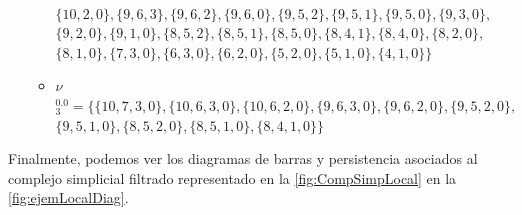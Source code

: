 \documentclass[12pt, a4paper, twoside]{book}
\numberwithin{equation}{section}
\theoremstyle{definition}
\newenvironment{ejem}
  {\pushQED{\qed}\renewcommand{\qedsymbol}{$\blacktriangleleft$}\ejemplo}
  {\popQED\endejemplo}
\theoremstyle{remark}
\theoremstyle{plain}
\begin{document}
\begin{ejem}
\begin{itemize}
\begin{itemize}
						\\$\{10, 2, 0\},\{9, 6, 3\},\{9, 6, 2\},\{9, 6, 0\},\{9, 5, 2\},\{9, 5, 1\},\{9, 5, 0\},\{9, 3, 0\},$
					\\$\{9, 2, 0\},\{9, 1, 0\},\{8, 5, 2\},\{8, 5, 1\},\{8, 5, 0\},\{8, 4, 1\},\{8, 4, 0\},\{8, 2, 0\},$
				\\$\{8, 1, 0\},\{7, 3, 0\},\{6, 3, 0\},\{6, 2, 0\},\{5, 2, 0\},\{5, 1, 0\},\{4, 1, 0\}\}$
					\item {\Large $\nu$}$^{0.0}_{3}=\{\{10, 7, 3, 0\},\{10, 6, 3, 0\},\{10, 6, 2, 0\},\{9, 6, 3, 0\},\{9, 6, 2, 0\},\{9, 5, 2, 0\},$
						\\$\{9, 5, 1, 0\},\{8, 5, 2, 0\},\{8, 5, 1, 0\},\{8, 4, 1, 0\}\}$
				\end{itemize}
		\end{itemize}

	Finalmente, podemos ver los diagramas de barras y persistencia 
	asociados al complejo simplicial filtrado representado en 
	la \autoref{fig:CompSimpLocal} en la \autoref{fig:ejemLocalDiag}.
	

\end{ejem}
\end{document}

